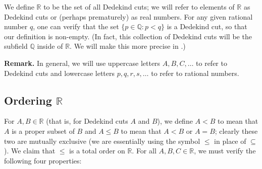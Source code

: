 \documentclass[12pt]{article}
\newcommand{\newp}{\vspace{5mm}}
\theoremstyle{definition}
\begin{document}
We define \( \mathbb{R} \) to be the set of all Dedekind cuts; we will refer to elements of \( \mathbb{R} \) as Dedekind cuts or (perhaps prematurely) as real numbers. For any given rational number \( q \), one can verify that the set \( \{ p \in \mathbb{Q} : p < q \} \) is a Dedekind cut, so that our definition is non-empty. (In fact, this collection of Dedekind cuts will be the subfield \( \mathbb{Q} \) inside of \( \mathbb{R} \). We will make this more precise in .)

\newp

\textbf{Remark.} In general, we will use uppercase letters \( A, B, C, \ldots \) to refer to Dedekind cuts and lowercase letters \( p, q, r, s, \ldots \) to refer to rational numbers.

\subsection{Ordering \texorpdfstring{\(\mathbb{R}\)}{}}
\label{sec:ordering_R}

For \( A, B \in \mathbb{R} \) (that is, for Dedekind cuts \( A \) and \( B \)), we define \( A < B \) to mean that \( A \) is a proper subset of \( B \) and \( A \leq B \) to mean that \( A < B \) or \( A = B \); clearly these two are mutually exclusive (we are essentially using the symbol \( \leq \) in place of \( \subseteq \)). We claim that \( \leq \) is a total order on \( \mathbb{R} \). For all \( A, B, C \in \mathbb{R} \), we must verify the following four properties:
\end{document}
